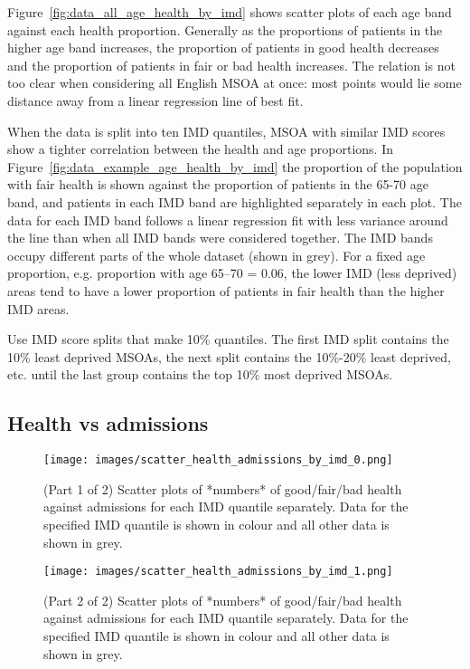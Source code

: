 \documentclass[12pt]{extarticle}
\begin{document}
Figure~\ref{fig:data_all_age_health_by_imd} shows scatter plots of each age band against each health proportion.
Generally as the proportions of patients in the higher age band increases, the proportion of patients in good health decreases and the proportion of patients in fair or bad health increases.
The relation is not too clear when considering all English MSOA at once: most points would lie some distance away from a linear regression line of best fit.

When the data is split into ten IMD quantiles, MSOA with similar IMD scores show a tighter correlation between the health and age proportions.
In Figure~\ref{fig:data_example_age_health_by_imd} the proportion of the population with fair health is shown against the proportion of patients in the 65-70 age band, and patients in each IMD band are highlighted separately in each plot.
The data for each IMD band follows a linear regression fit with less variance around the line than when all IMD bands were considered together.
The IMD bands occupy different parts of the whole dataset (shown in grey).
For a fixed age proportion, e.g. proportion with age 65--70 = 0.06, the lower IMD (less deprived) areas tend to have a lower proportion of patients in fair health than the higher IMD areas.

Use IMD score splits that make 10\% quantiles. The first IMD split contains the 10\% least deprived MSOAs, the next split contains the 10\%-20\% least deprived, etc. until the last group contains the top 10\% most deprived MSOAs.


\subsection{Health vs admissions}

\begin{figure}[!b]
    \centering
    \texttt{[image: images/scatter\_health\_admissions\_by\_imd\_0.png]}
    \caption{(Part 1 of 2) Scatter plots of *numbers* of good/fair/bad health against admissions for each IMD quantile separately. Data for the specified IMD quantile is shown in colour and all other data is shown in grey.}
\end{figure}

\begin{figure}[ht]\ContinuedFloat  %
    \centering
    \texttt{[image: images/scatter\_health\_admissions\_by\_imd\_1.png]}
    \caption{(Part 2 of 2) Scatter plots of *numbers* of good/fair/bad health against admissions for each IMD quantile separately. Data for the specified IMD quantile is shown in colour and all other data is shown in grey.}
    \label{fig:data_health_admissions_by_imd}
\end{figure}
\clearpage
\end{document}
